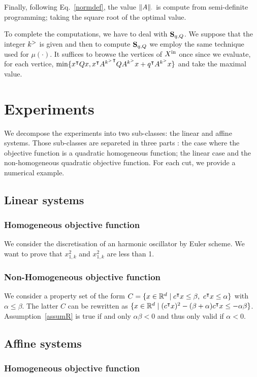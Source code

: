 \documentclass[10pt]{article}
\begin{document}
Finally, following Eq.~\eqref{normdef}, the value $\| A\|_\cdot$ is compute from semi-definite programming; taking the square root of the optimal value.

To complete the computations, we have to deal with $\mathbf{S}_{q,Q}$. We suppose that the integer $k^{>}$ is given and then to compute $\mathbf{S}_{q,Q}$ we employ the same technique used for $\mu(\cdot)$. It suffices to browse the vertices of $X^\mathrm{in}$ once since we evaluate, for each vertice, $\min\{x^\intercal Q x, x^\intercal {A^{k^{>}}}^\intercal Q {A^{k^{>}}}x+q^\intercal A^{k^{>}} x\}$ and take the maximal value. 
\section{Experiments}
\label{experiments}
We decompose the experiments into two sub-classes: the linear and affine systems. Those sub-classes are separeted in three parts : the  case where the objective function is a quadratic homogeneous function; the linear case and the non-homogeneous quadratic objective function. For each cut, we provide a numerical example.  
\subsection{Linear systems}

\subsubsection{Homogeneous objective function}
We consider the discretisation of an harmonic oscillator by Euler scheme. We want to prove that $x_{1,k}^2$ and $x_{1,k}^2$ are less than 1.
 
\subsubsection{Non-Homogeneous objective function}
We consider a property set of the form $C=\{x\in\rd\mid c^\intercal x\leq \beta,\ c^\intercal x\leq \alpha \}$ with $\alpha\leq \beta$. The latter $C$ can be rewritten as $\{x\in\mathbb R^d\mid (c^\intercal x)^2-(\beta+\alpha) c^\intercal x\leq -\alpha\beta\}$. Assumption~\eqref{assumR} is true if and only $\alpha\beta< 0$ and thus only valid if $\alpha<0$. 

\subsection{Affine systems}

\subsubsection{Homogeneous objective function}
\end{document}
